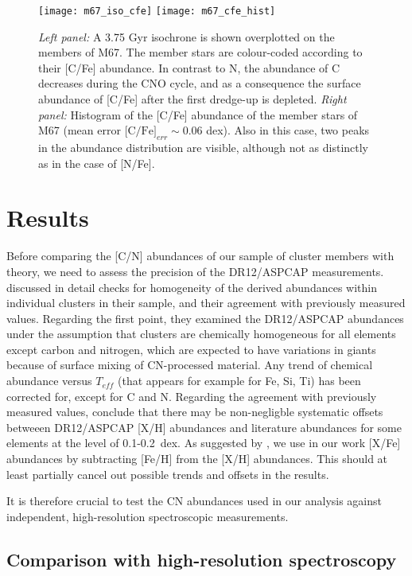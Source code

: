 \documentclass[a4paper,fleqn,usenatbib]{mnras}
\begin{document}
\begin{figure*}
	\texttt{[image: m67\_iso\_cfe]}
	\texttt{[image: m67\_cfe\_hist]}
	\caption{\textit{Left panel:} A 3.75 Gyr isochrone is shown overplotted on the members of M67. The member stars are colour-coded according to their [C/Fe] abundance. In contrast to N, the abundance of C decreases during the CNO cycle, and as a consequence the surface abundance of [C/Fe] after the first dredge-up is depleted. \textit{Right panel:} Histogram of the [C/Fe] abundance of the member stars of M67 (mean error $\text{[C/Fe]}_{err}\sim0.06$ dex). Also in this case, two peaks in the abundance distribution are visible, although not as distinctly as in the case of [N/Fe].}
	\label{fig:ab_iso_cfe}
\end{figure*}




\section{Results}
\label{sec:res}

Before comparing the [C/N] abundances of our sample of cluster members with theory, we need to assess the precision of the DR12/ASPCAP measurements. 
\citet{holtzman2015} discussed in detail checks for homogeneity of the derived abundances within individual clusters in their sample, and their agreement with previously measured values.
Regarding the first point, they examined the DR12/ASPCAP abundances under the assumption that clusters are chemically homogeneous for all elements except carbon and nitrogen, which are expected to have variations in giants because of surface mixing of CN-processed material. Any trend of chemical abundance versus $T_{eff}$ (that appears for example for Fe, Si, Ti) has been corrected for, except for C and N.   
Regarding the agreement with previously measured values, \citet{holtzman2015} conclude that there may be non-negligble systematic offsets betweeen DR12/ASPCAP [X/H] abundances and literature abundances for some elements at the level of 0.1-0.2~dex. As suggested by  \citet{holtzman2015}, we use in our work [X/Fe] abundances by subtracting [Fe/H] from the [X/H] abundances. This should at least partially cancel out possible trends and offsets in the results.

It is therefore crucial to test the CN abundances used in our analysis against independent, high-resolution spectroscopic measurements. 

\subsection{Comparison with high-resolution spectroscopy}
\label{sec:obs}
\end{document}
